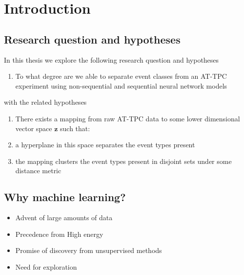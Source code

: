\chapter{Introduction}\label{ch:introduction}

\section{Research question and hypotheses}
In this thesis we explore the following research question and hypotheses 

\begin{enumerate}[start=0, label={(\bfseries R\arabic*):}]
\item To what degree are we able to separate event classes from an AT-TPC experiment using non-sequential and sequential neural network models 
\end{enumerate}

\noindent with the related hypotheses 

\begin{enumerate}[start=0, label={(\bfseries H\arabic*):}]
\item[] There exists a mapping from raw AT-TPC data to some lower dimensional vector space $\mathbf{z}$ such that: 
\item a hyperplane in this space separates the event types present
\item the mapping clusters the event types present in disjoint sets under some distance metric
\end{enumerate}

\section{Why machine learning?}

\begin{itemize}
\item Advent of large amounts of data \\
\item Precedence from High energy \\
\item Promise of discovery from unsupervised methods \\
\item Need for exploration 
\end{itemize}